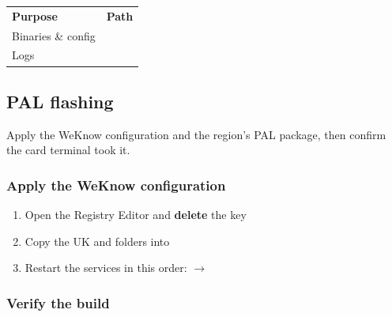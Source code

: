 \documentclass[a4paper,10pt]{article}
\begin{document}
\begin{center}
\renewcommand{\arraystretch}{1.3}\small
\begin{tabularx}{\textwidth}{L{30mm} X}
\color{white}\textbf{Purpose} &
\color{white}\textbf{Path}\\
Binaries \& config &
\\
Logs &
\\
\end{tabularx}
\end{center}

\subsection{PAL flashing}\label{sec:pal}

Apply the WeKnow configuration and the region's PAL package, then confirm
the card terminal took it.

\subsubsection{Apply the WeKnow configuration}

\begin{enumerate}
  \item Open the Registry Editor and \textbf{delete} the key\\

  \item Copy the UK  and  folders into\\

  \item Restart the services in this order:
         $\rightarrow$ 
\end{enumerate}

\subsubsection{Verify the build}\label{sec:fccverify}
\end{document}
